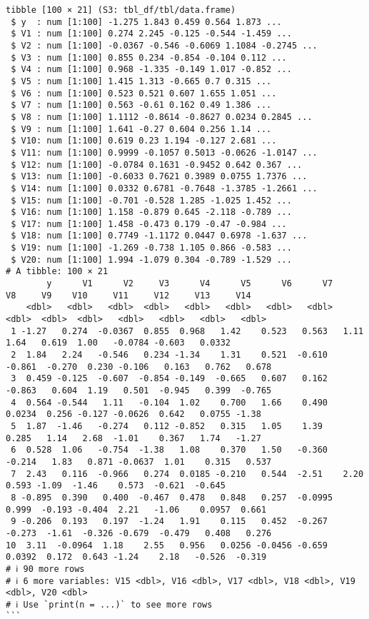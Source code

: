 \documentclass[
]{article}
\begin{document}
\begin{verbatim}
tibble [100 × 21] (S3: tbl_df/tbl/data.frame)
 $ y  : num [1:100] -1.275 1.843 0.459 0.564 1.873 ...
 $ V1 : num [1:100] 0.274 2.245 -0.125 -0.544 -1.459 ...
 $ V2 : num [1:100] -0.0367 -0.546 -0.6069 1.1084 -0.2745 ...
 $ V3 : num [1:100] 0.855 0.234 -0.854 -0.104 0.112 ...
 $ V4 : num [1:100] 0.968 -1.335 -0.149 1.017 -0.852 ...
 $ V5 : num [1:100] 1.415 1.313 -0.665 0.7 0.315 ...
 $ V6 : num [1:100] 0.523 0.521 0.607 1.655 1.051 ...
 $ V7 : num [1:100] 0.563 -0.61 0.162 0.49 1.386 ...
 $ V8 : num [1:100] 1.1112 -0.8614 -0.8627 0.0234 0.2845 ...
 $ V9 : num [1:100] 1.641 -0.27 0.604 0.256 1.14 ...
 $ V10: num [1:100] 0.619 0.23 1.194 -0.127 2.681 ...
 $ V11: num [1:100] 0.9999 -0.1057 0.5013 -0.0626 -1.0147 ...
 $ V12: num [1:100] -0.0784 0.1631 -0.9452 0.642 0.367 ...
 $ V13: num [1:100] -0.6033 0.7621 0.3989 0.0755 1.7376 ...
 $ V14: num [1:100] 0.0332 0.6781 -0.7648 -1.3785 -1.2661 ...
 $ V15: num [1:100] -0.701 -0.528 1.285 -1.025 1.452 ...
 $ V16: num [1:100] 1.158 -0.879 0.645 -2.118 -0.789 ...
 $ V17: num [1:100] 1.458 -0.473 0.179 -0.47 -0.984 ...
 $ V18: num [1:100] 0.7749 -1.1172 0.0447 0.6978 -1.637 ...
 $ V19: num [1:100] -1.269 -0.738 1.105 0.866 -0.583 ...
 $ V20: num [1:100] 1.994 -1.079 0.304 -0.789 -1.529 ...
# A tibble: 100 × 21
        y      V1      V2     V3      V4      V5      V6      V7      V8     V9    V10     V11     V12     V13     V14
    <dbl>   <dbl>   <dbl>  <dbl>   <dbl>   <dbl>   <dbl>   <dbl>   <dbl>  <dbl>  <dbl>   <dbl>   <dbl>   <dbl>   <dbl>
 1 -1.27   0.274  -0.0367  0.855  0.968   1.42    0.523   0.563   1.11    1.64   0.619  1.00   -0.0784 -0.603   0.0332
 2  1.84   2.24   -0.546   0.234 -1.34    1.31    0.521  -0.610  -0.861  -0.270  0.230 -0.106   0.163   0.762   0.678 
 3  0.459 -0.125  -0.607  -0.854 -0.149  -0.665   0.607   0.162  -0.863   0.604  1.19   0.501  -0.945   0.399  -0.765 
 4  0.564 -0.544   1.11   -0.104  1.02    0.700   1.66    0.490   0.0234  0.256 -0.127 -0.0626  0.642   0.0755 -1.38  
 5  1.87  -1.46   -0.274   0.112 -0.852   0.315   1.05    1.39    0.285   1.14   2.68  -1.01    0.367   1.74   -1.27  
 6  0.528  1.06   -0.754  -1.38   1.08    0.370   1.50   -0.360  -0.214   1.83   0.871 -0.0637  1.01    0.315   0.537 
 7  2.43   0.116  -0.966   0.274  0.0185 -0.210   0.544  -2.51    2.20    0.593 -1.09  -1.46    0.573  -0.621  -0.645 
 8 -0.895  0.390   0.400  -0.467  0.478   0.848   0.257  -0.0995  0.999  -0.193 -0.404  2.21   -1.06    0.0957  0.661 
 9 -0.206  0.193   0.197  -1.24   1.91    0.115   0.452  -0.267  -0.273  -1.61  -0.326 -0.679  -0.479   0.408   0.276 
10  3.11  -0.0964  1.18    2.55   0.956   0.0256 -0.0456 -0.659   0.0392  0.172  0.643 -1.24    2.18   -0.526  -0.319 
# ℹ 90 more rows
# ℹ 6 more variables: V15 <dbl>, V16 <dbl>, V17 <dbl>, V18 <dbl>, V19 <dbl>, V20 <dbl>
# ℹ Use `print(n = ...)` to see more rows
```
\end{verbatim}
\end{document}
